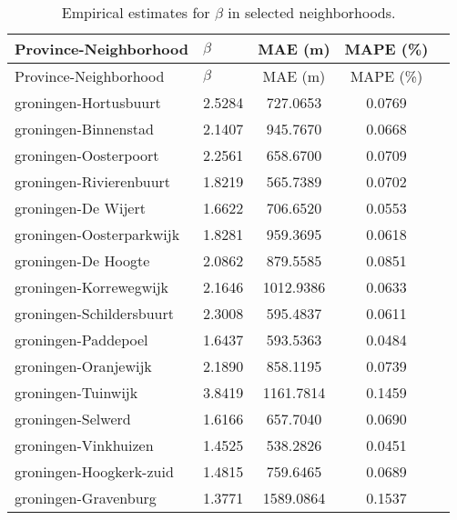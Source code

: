 \begin{longtable}{llccc}
	\caption{Empirical estimates for $\beta$ in selected neighborhoods.} \label{tab:results} \\
	\hline
	Province-Neighborhood                     & $\beta$ & MAE (m)   & MAPE (\%)              \\
	\hline
	\endfirsthead
	\hline
	Province-Neighborhood                     & $\beta$ & MAE (m)   & MAPE (\%)              \\
	\hline
	\endhead
	groningen-Hortusbuurt                     & 2.5284  & 727.0653  & 0.0769                 \\
	groningen-Binnenstad                      & 2.1407  & 945.7670  & 0.0668                 \\
	groningen-Oosterpoort                     & 2.2561  & 658.6700  & 0.0709                 \\
	groningen-Rivierenbuurt                   & 1.8219  & 565.7389  & 0.0702                 \\
	groningen-De Wijert                       & 1.6622  & 706.6520  & 0.0553                 \\
	groningen-Oosterparkwijk                  & 1.8281  & 959.3695  & 0.0618                 \\
	groningen-De Hoogte                       & 2.0862  & 879.5585  & 0.0851                 \\
	groningen-Korrewegwijk                    & 2.1646  & 1012.9386 & 0.0633                 \\
	groningen-Schildersbuurt                  & 2.3008  & 595.4837  & 0.0611                 \\
	groningen-Paddepoel                       & 1.6437  & 593.5363  & 0.0484                 \\
	groningen-Oranjewijk                      & 2.1890  & 858.1195  & 0.0739                 \\
	groningen-Tuinwijk                        & 3.8419  & 1161.7814 & 0.1459                 \\
	groningen-Selwerd                         & 1.6166  & 657.7040  & 0.0690                 \\
	groningen-Vinkhuizen                      & 1.4525  & 538.2826  & 0.0451                 \\
	groningen-Hoogkerk-zuid                   & 1.4815  & 759.6465  & 0.0689                 \\
	groningen-Gravenburg                      & 1.3771  & 1589.0864 & 0.1537                 \\

\end{longtable}
